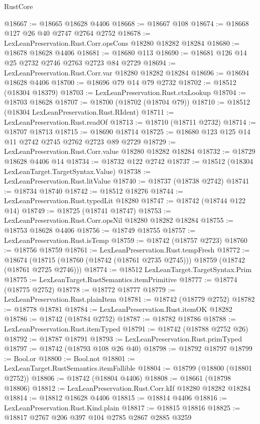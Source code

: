 \begin{lexlean}{RustCore}
\begin{coremodule}
@18667 := @18665 @18628 @4406
@18668 := @18667 @108
@18674 := @18668 @127 @26 @40 @2747 @2764 @2752
@18678 := LexLeanPreservation.Rust.Corr.opsCons @18280 @18282 @18284
@18680 := @18678 @18628 @4406
@18681 := @18680 @113
@18690 := @18681 @126 @14 @25 @2732 @2746 @2763 @2723 @84 @2729
@18694 := LexLeanPreservation.Rust.Corr.var @18280 @18282 @18284
@18696 := @18694 @18628 @4406
@18700 := @18696 @79 @14 @79 @2732
@18702 := @18512 (@18304 @18379)
@18703 := LexLeanPreservation.Rust.ctxLookup
@18704 := @18703 @18628
@18707 := @18700 (@18702 (@18704 @79))
@18710 := @18512 (@18304 LexLeanPreservation.Rust.RIdent)
@18711 := LexLeanPreservation.Rust.readOf
@18713 := @18710 (@18711 @2732)
@18714 := @18707 @18713
@18715 := @18690 @18714
@18725 := @18680 @123 @125 @14 @11 @2742 @2745 @2762 @2723 @89 @2729
@18729 := LexLeanPreservation.Rust.Corr.value @18280 @18282 @18284
@18732 := @18729 @18628 @4406 @14
@18734 := @18732 @122 @2742
@18737 := @18512 (@18304 LexLeanTarget.TargetSyntax.Value)
@18738 := LexLeanPreservation.Rust.litValue
@18740 := @18737 (@18738 @2742)
@18741 := @18734 @18740
@18742 := @18512 @18276
@18744 := LexLeanPreservation.Rust.typedLit @18280
@18747 := @18742 (@18744 @122 @14)
@18749 := @18725 (@18741 @18747)
@18753 := LexLeanPreservation.Rust.Corr.opsNil @18280 @18282 @18284
@18755 := @18753 @18628 @4406
@18756 := @18749 @18755
@18757 := LexLeanPreservation.Rust.isTemp
@18759 := @18742 (@18757 @2723)
@18760 := @18756 @18759
@18761 := LexLeanPreservation.Rust.tempFresh
@18772 := @18674
    (@18715 (@18760 (@18742 (@18761 @2735 @2745))) @18759 (@18742 (@18761 @2725 @2746)))
@18774 := @18512 LexLeanTarget.TargetSyntax.Prim
@18775 := LexLeanTarget.RustSemantics.itemPrimitive
@18777 := @18774 (@18775 @2752)
@18778 := @18772 @18777
@18779 := LexLeanPreservation.Rust.plainItem
@18781 := @18742 (@18779 @2752)
@18782 := @18778 @18781
@18784 := LexLeanPreservation.Rust.itemOK @18282
@18786 := @18742 (@18784 @2752)
@18787 := @18782 @18786
@18788 := LexLeanPreservation.Rust.itemTyped
@18791 := @18742 (@18788 @2752 @26)
@18792 := @18787 @18791
@18793 := LexLeanPreservation.Rust.primTyped
@18797 := @18742 (@18793 @108 @26 @40)
@18798 := @18792 @18797
@18799 := Bool.or
@18800 := Bool.not
@18801 := LexLeanTarget.RustSemantics.itemFallible
@18804 := @18799 (@18800 (@18801 @2752))
@18806 := @18742 (@18804 @4406)
@18808 := @18661 (@18798 @18806)
@18812 := LexLeanPreservation.Rust.Corr.kIf @18280 @18282 @18284
@18814 := @18812 @18628 @4406
@18815 := @18814 @4406
@18816 := LexLeanPreservation.Rust.Kind.plain
@18817 := @18815 @18816
@18825 := @18817 @2767 @206 @397 @104 @2785 @2867 @2885 @3259

\end{coremodule}
\end{lexlean}
